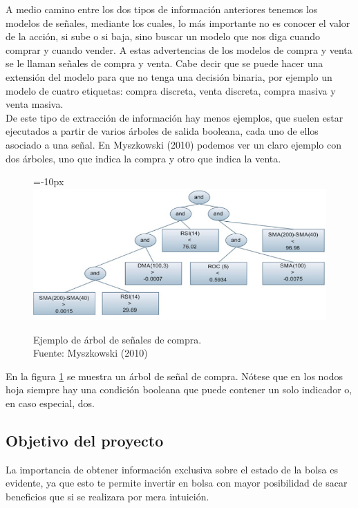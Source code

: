      A medio camino entre los dos tipos de informaci\'on anteriores tenemos los modelos de señales, mediante los cuales, lo m\'as importante no es conocer el valor de la acci\'on, si sube o si baja, sino buscar un modelo que nos diga cuando comprar y cuando vender. A estas advertencias de los modelos de compra y venta se le llaman se\~nales de compra y venta. Cabe decir que se puede hacer una extensi\'on del modelo para que no tenga una decisi\'on binaria, por ejemplo un modelo de cuatro etiquetas: compra discreta, venta discreta, compra masiva y venta masiva. \\
     
     De este tipo de extracci\'on de informaci\'on hay menos ejemplos, que suelen estar ejecutados a partir de varios \'arboles de salida booleana, cada uno de ellos asociado a una se\~nal. En Myszkowski (2010) podemos ver un claro ejemplo con dos \'arboles, uno que indica la compra y otro que indica la venta.\\
     
     	\begin{figure}[H]
			\centering\leftskip=-10px
			\includegraphics[scale=0.8]{imagenes/tree_halfinfo.png}
			\caption[Ejemplo de \'arbol de señales de compra]{Ejemplo de \'arbol de señales de compra. \\Fuente: Myszkowski (2010)}
			\label{fig:tree_half_info}
		\end{figure}
		
	En la figura \ref{fig:tree_half_info} se muestra un \'arbol de se\~nal de compra. N\'otese que en los nodos hoja siempre hay una condici\'on booleana que puede contener un solo indicador o, en caso especial, dos.\\
	
	\subsection{Objetivo del proyecto}
	La importancia de obtener informaci\'on exclusiva sobre el estado de la bolsa es evidente, ya que esto te permite invertir en bolsa con mayor posibilidad de sacar beneficios que si se realizara por mera intuici\'on.\\
	
